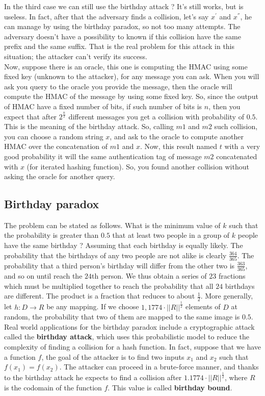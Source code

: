 \documentclass[11pt]{article}
\begin{document}
In the third case we can still use the birthday attack ? It's still works, but is useless. In fact, after that the adversary finds a collision, let's say $x^{'}$ and $x^{''}$, he can manage by using the birthday paradox, so not too many attempts. The adversary doesn't have a possibility to known if this collision have the same prefix and the same suffix. That is the real problem for this attack in this situation; the attacker can't verify its success.\\Now, suppose there is an oracle, this one is computing the HMAC using some fixed key (unknown to the attacker), for any message you can ask. When you will ask you query to the oracle you provide the message, then the oracle will compute the HMAC of the message by using some fixed key. So, since the output of HMAC have a fixed number of bits, if such number of bits is $n$, then you expect that after $2^{\frac{n}{2}}$ different messages you get a collision with probability of $0.5$. This is the meaning of the birthday attack. So, calling $m1$ and $m2$ such collision, you can choose a random string $x$, and ask to the oracle to compute another HMAC over the concatenation of $m1$ and $x$. Now, this result named $t$ with a very good probability it will the same authentication tag of message $m2$ concatenated with $x$ (for iterated hashing function). So, you found another collision without asking the oracle for another query.
\subsection{Birthday paradox}
The problem can be stated as follows. What is the minimum value of $k$ such that the probability is greater than $0.5$ that at least two people in a group of $k$ people have the same birthday ? Assuming that each birthday is equally likely. The probability that the birthdays of any two people are not alike is clearly $\frac{364}{365}$.  The probability that a third person's birthday will differ from the other two is $\frac{363}{365}$, and so on until reach the $24$th person. We thus obtain a series of $23$ fractions which must be multiplied together to reach the probability that all $24$ birthdays are different. The product is a fraction that reduces to about $\frac{1}{2}$. More generally, let $h : D \rightarrow R$ be any mapping. If we choose $1,1774 \cdot ||R||^{\frac{1}{2}}$ elements of $D$ at random, the probability that two of them are mapped to the same image is $0.5$. Real world applications for the birthday paradox include a cryptographic attack called the \textbf{birthday attack}, which uses this probabilistic model to reduce the complexity of finding a collision for a hash function. In fact, suppose that we have a function $f$, the goal of the attacker is to find two inputs $x_1$ and $x_2$ such that $f(x_1) = f(x_2)$. The attacker can proceed in a brute-force manner, and thanks to the birthday attack he expects to find a collision after $1.1774 \cdot || R ||^{\frac{1}{2}}$, where $R$ is the codomain of the function $f$. This value is called \textbf{birthday bound}.
\end{document}
